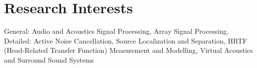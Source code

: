 \documentclass[11pt]{article}
\begin{document}
\section*{Research Interests}
General: Audio and Acoustics Signal Processing, Array Signal Processing, \\
Detailed: Active Noise Cancellation, Source Localization and Separation, HRTF (Head-Related Transfer Function) Measurement and Modelling, Virtual Acoustics and Surround Sound Systems 

%

\end{document}
